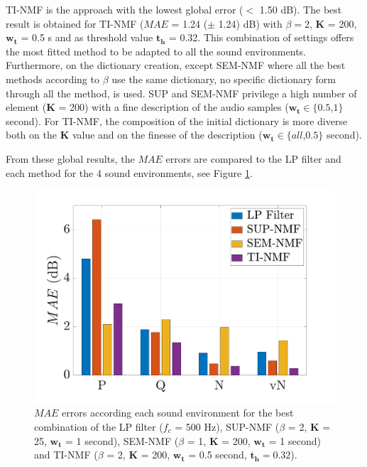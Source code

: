 \documentclass[review,5p,twocolumn,sort&compress,times]{elsarticle}
\begin{document}
TI-NMF is the approach with the lowest global error ($<$ 1.50 dB). The best result is obtained for TI-NMF ($MAE$ = 1.24 ($\pm$ 1.24) dB) with $\beta = 2$, $\mathbf{K}$ = 200, $\mathbf{w_t}$ = 0.5 s and as threshold value $\mathbf{t_h}$ = 0.32. This combination of settings offers the most fitted method to be adapted to all the sound environments. 
Furthermore, on the dictionary creation, except SEM-NMF where all the best methods according to $\beta$ use the same dictionary, no specific dictionary form through all the method, is used. SUP and SEM-NMF privilege a high number of element ($\mathbf{K}$ = 200) with a fine description of the audio samples ($\mathbf{w_t} \in \lbrace 0.5$,$1 \rbrace$ second). For TI-NMF, the composition of the initial dictionary is more diverse both on the $\mathbf{K}$ value and on the finesse  of the description ($\mathbf{w_t} \in \lbrace all$,$0.5 \rbrace$ second). 

From these global results, the $MAE$ errors are compared to the LP filter and each method for the 4 sound environments, see Figure \ref{fig:mae_env}. 

\begin{figure}[t]
\centering
\includegraphics[width=\linewidth]{figures/mea_grafic_bar.pdf}
\caption{$MAE$ errors according each sound environment for the best combination of the LP filter ($f_c$ = 500 Hz), SUP-NMF ($\beta$ = 2, $\mathbf{K}$ = 25, $\mathbf{w_t}$ = 1 second), SEM-NMF ($\beta$ = 1, $\mathbf{K}$ = 200, $\mathbf{w_t}$ = 1 second) and TI-NMF ($\beta$ = 2, $\mathbf{K}$ = 200, $\mathbf{w_t}$ = 0.5 second, $\mathbf{t_{h}} = 0.32$).}
\label{fig:mae_env}
\end{figure}
\end{document}
